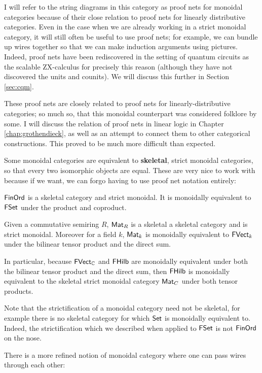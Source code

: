 I will refer to the string diagrams in this category as proof nets for monoidal categories because of their close relation to proof nets for linearly distributive categories.  Even in the case when we are already working in a strict monoidal category, it will still often be useful to use proof nets; for example, we can bundle up wires together so that we can make induction arguments using pictures.  Indeed, proof nets have been rediscovered in the setting of quantum circuits as the scalable ZX-calculus for precisely this reason \cite{szx} (although they have not discovered the units and counits).  We will discuss this further in Section \ref{sec:cqm}.


These proof nets are closely related to proof nets for linearly-distributive categories; so much so, that this monoidal counterpart was considered folklore by some.  I will discuss the relation of proof nets in linear logic in Chapter \ref{chap:grothendieck}, as well as an attempt to connect them to other categorical constructions.  This proved to be much more difficult than expected.



Some monoidal categories are equivalent to {\bf skeletal}, strict monoidal categories, so that every two isomorphic objects are equal.  These are very nice to work with because if we want, we can forgo having to use proof net notation entirely:
\begin{example}
$\mathsf{FinOrd}$ is a skeletal category and strict monoidal. It is monoidally equivalent to $\mathsf{FSet}$ under the product and coproduct.


Given a commutative semiring $R$, $\mathsf{Mat}_R$ is a skeletal a skeletal category and is strict monoidal. Moreover for a field $k$, $\mathsf{Mat}_k$ is monoidally equivalent to $\mathsf{FVect}_k$ under the bilinear tensor product and the direct sum.

In particular, because $\mathsf{FVect}_{\mathbb{C}}$ and $\mathsf{FHilb}$ are monoidally equivalent under both the bilinear tensor product and the direct sum, then $\mathsf{FHilb}$ is monoidally equivalent to the skeletal strict monoidal category $\mathsf{Mat}_C$ under both tensor products.
\end{example}
Note that the strictification of a monoidal category need not be skeletal, for example there is no skeletal category for which $\mathsf{Set}$ is monoidally equivalent to.  Indeed, the strictification which we described when applied to $\mathsf{FSet}$ is not $\mathsf{FinOrd}$ on the nose.


There is a more refined notion of monoidal category where one can pass wires through each other:

